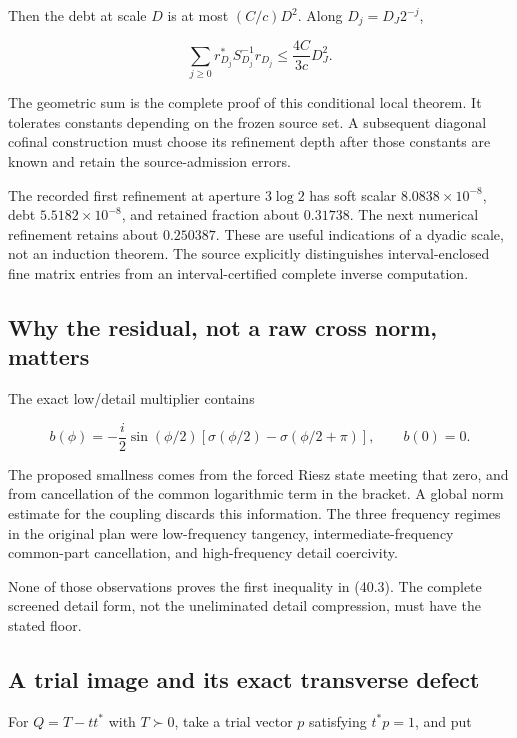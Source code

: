 \documentclass[
  10pt,
  a4paper,
  10pt,
  oneside,
  openany]{book}
\begin{document}
Then the debt at scale \(D\) is at most \((C/c)D^2\). Along
\(D_j=D_J2^{-j}\),

\[
 \sum_{j\ge0}r_{D_j}^{*}S_{D_j}^{-1}r_{D_j}
 \le\frac{4C}{3c}D_J^2.
 \tag{40.4}\label{eq:40.4}
\]

The geometric sum is the complete proof of this conditional local
theorem. It tolerates constants depending on the frozen source set. A
subsequent diagonal cofinal construction must choose its refinement
depth after those constants are known and retain the source-admission
errors.

The recorded first refinement at aperture \(3\log2\) has soft scalar
\(8.0838\times10^{-8}\), debt \(5.5182\times10^{-8}\), and retained
fraction about \(0.31738\). The next numerical refinement retains about
\(0.250387\). These are useful indications of a dyadic scale, not an
induction theorem. The source explicitly distinguishes interval-enclosed
fine matrix entries from an interval-certified complete inverse
computation.

\subsection{Why the residual, not a raw cross norm,
matters}\label{why-the-residual-not-a-raw-cross-norm-matters}

The exact low/detail multiplier contains

\[
 b(\phi)=-\frac i2\sin(\phi/2)
 [\sigma(\phi/2)-\sigma(\phi/2+\pi)],
 \qquad b(0)=0.
 \tag{40.5}\label{eq:40.5}
\]

The proposed smallness comes from the forced Riesz state meeting that
zero, and from cancellation of the common logarithmic term in the
bracket. A global norm estimate for the coupling discards this
information. The three frequency regimes in the original plan were
low-frequency tangency, intermediate-frequency common-part cancellation,
and high-frequency detail coercivity.

None of those observations proves the first inequality in (40.3). The
complete screened detail form, not the uneliminated detail compression,
must have the stated floor.

\subsection{A trial image and its exact transverse
defect}\label{a-trial-image-and-its-exact-transverse-defect}

For \(Q=T-tt^{*}\) with \(T\succ0\), take a trial vector \(p\)
satisfying \(t^{*}p=1\), and put
\end{document}
